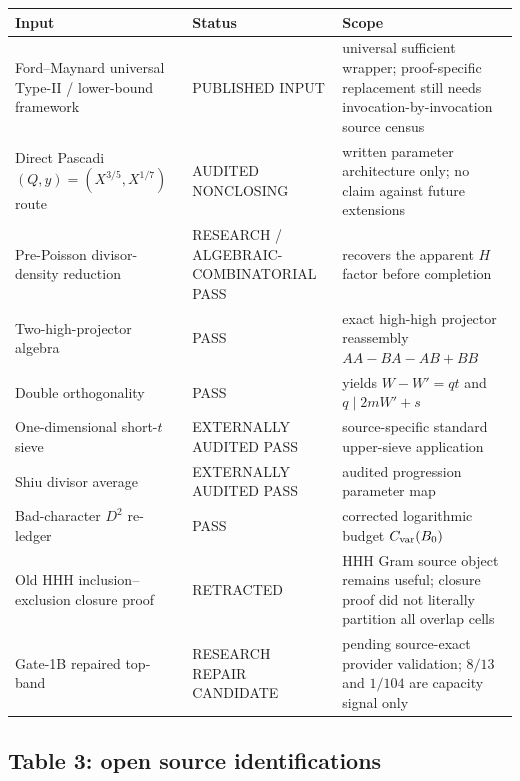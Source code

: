 \documentclass[11pt]{article}
\theoremstyle{definition}
\newcommand{\1}{\mathbf 1}
\newcommand{\status}[1]{\textsf{#1}}
\begin{document}
\begin{center}
\scriptsize
\renewcommand{\arraystretch}{1.12}
\begin{tabularx}{\textwidth}{p{}p{}X}
\toprule
Input & Status & Scope\\
\midrule
Ford--Maynard universal Type-II / lower-bound framework & \status{PUBLISHED INPUT} & universal sufficient wrapper; proof-specific replacement still needs invocation-by-invocation source census\\
Direct Pascadi $(Q,y)=(X^{3/5},X^{1/7})$ route & \status{AUDITED NONCLOSING} & written parameter architecture only; no claim against future extensions\\
Pre-Poisson divisor-density reduction & \status{RESEARCH / ALGEBRAIC-COMBINATORIAL PASS} & recovers the apparent $H$ factor before completion\\
Two-high-projector algebra & \status{PASS} & exact high-high projector reassembly $AA-BA-AB+BB$\\
Double orthogonality & \status{PASS} & yields $W-W'=qt$ and $q\mid2mW'+s$\\
One-dimensional short-$t$ sieve & \status{EXTERNALLY AUDITED PASS} & source-specific standard upper-sieve application\\
Shiu divisor average & \status{EXTERNALLY AUDITED PASS} & audited progression parameter map\\
Bad-character $D^2$ re-ledger & \status{PASS} & corrected logarithmic budget $C_{\rm var}(B_0)$\\
Old HHH inclusion--exclusion closure proof & \status{RETRACTED} & HHH Gram source object remains useful; closure proof did not literally partition all overlap cells\\
Gate-1B repaired top-band & \status{RESEARCH REPAIR CANDIDATE} & pending source-exact provider validation; $8/13$ and $1/104$ are capacity signal only\\
\bottomrule
\end{tabularx}
\end{center}

\subsection{Table 3: open source identifications}
\end{document}
